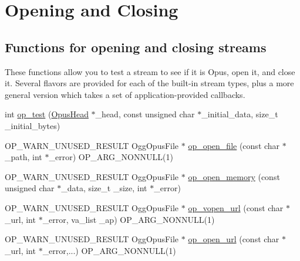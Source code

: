 \hypertarget{group__stream__open__close}{}\section{Opening and Closing}
\label{group__stream__open__close}
\subsection*{Functions for opening and closing streams}
\label{_amgrpa843b580da843f32fd1721f9622af57c}%
These functions allow you to test a stream to see if it is Opus, open it, and close it. Several flavors are provided for each of the built-\/in stream types, plus a more general version which takes a set of application-\/provided callbacks. \begin{DoxyCompactItemize}
\item 
int \mbox{\hyperlink{group__stream__open__close_ga54158ed1570a0062cb674115cd3699ab}{op\+\_\+test}} (\mbox{\hyperlink{struct_opus_head}{Opus\+Head}} $\ast$\+\_\+head, const unsigned char $\ast$\+\_\+initial\+\_\+data, size\+\_\+t \+\_\+initial\+\_\+bytes)
\item 
O\+P\+\_\+\+W\+A\+R\+N\+\_\+\+U\+N\+U\+S\+E\+D\+\_\+\+R\+E\+S\+U\+LT Ogg\+Opus\+File $\ast$ \mbox{\hyperlink{group__stream__open__close_ga15866bd0cd7ac77162db3b0428962e75}{op\+\_\+open\+\_\+file}} (const char $\ast$\+\_\+path, int $\ast$\+\_\+error) O\+P\+\_\+\+A\+R\+G\+\_\+\+N\+O\+N\+N\+U\+LL(1)
\item 
O\+P\+\_\+\+W\+A\+R\+N\+\_\+\+U\+N\+U\+S\+E\+D\+\_\+\+R\+E\+S\+U\+LT Ogg\+Opus\+File $\ast$ \mbox{\hyperlink{group__stream__open__close_gaffc5769a1e5977f186f77a1fb08cb248}{op\+\_\+open\+\_\+memory}} (const unsigned char $\ast$\+\_\+data, size\+\_\+t \+\_\+size, int $\ast$\+\_\+error)
\item 
O\+P\+\_\+\+W\+A\+R\+N\+\_\+\+U\+N\+U\+S\+E\+D\+\_\+\+R\+E\+S\+U\+LT Ogg\+Opus\+File $\ast$ \mbox{\hyperlink{group__stream__open__close_ga9a0c2a744653a559b84a5be8f551fe8a}{op\+\_\+vopen\+\_\+url}} (const char $\ast$\+\_\+url, int $\ast$\+\_\+error, va\+\_\+list \+\_\+ap) O\+P\+\_\+\+A\+R\+G\+\_\+\+N\+O\+N\+N\+U\+LL(1)
\item 
O\+P\+\_\+\+W\+A\+R\+N\+\_\+\+U\+N\+U\+S\+E\+D\+\_\+\+R\+E\+S\+U\+LT Ogg\+Opus\+File $\ast$ \mbox{\hyperlink{group__stream__open__close_gace8a90b60d492f3488ee3f14a7276ddf}{op\+\_\+open\+\_\+url}} (const char $\ast$\+\_\+url, int $\ast$\+\_\+error,...) O\+P\+\_\+\+A\+R\+G\+\_\+\+N\+O\+N\+N\+U\+LL(1)
\item 

\end{DoxyCompactItemize}
